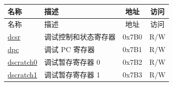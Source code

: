 \begin{longtable}{ | p{4.0cm} | p{8.4cm} | c | c| }
\hline\rowcolor{lightgray}
名称 & 描述 & 地址 & 访问 \\ \hline
\endfirsthead
\hline
\rowcolor{lightgray}
名称 & 描述 & 地址 & 访问  \\
\hline
\endhead
\endfoot

\hyperref[regdesc:DCSR]{dcsr} & 调试控制和状态寄存器  & 0x7B0 & R/W \\\hline
\hyperref[regdesc:DPC]{dpc} & 调试 PC 寄存器 & 0x7B1 & R/W \\\hline
\hyperref[regdesc:DSCRATCH0]{dscratch0} & 调试暂存寄存器 0 & 0x7B2 & R/W \\\hline
\hyperref[regdesc:DSCRATCH1]{dscratch1} & 调试暂存寄存器 1 & 0x7B3 & R/W \\\hline
\end{longtable}